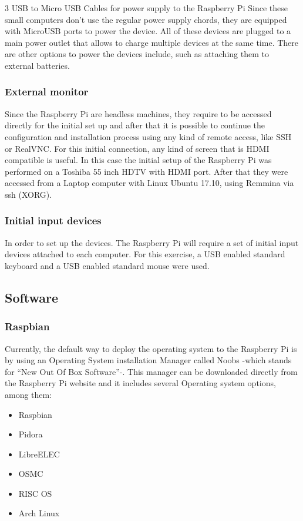 \documentclass[sigconf]{acmart}
\begin{document}
	3 USB to Micro USB Cables for power supply to the Raspberry Pi
	Since these small computers don’t use the regular power supply chords, they are equipped with MicroUSB ports to power the device.
	All of these devices are plugged to a main power outlet that allows to charge multiple devices at the same time.
	There are other options to power the devices include, such as attaching them to external batteries.
	
	\subsubsection{External monitor}
	
	Since the Raspberry Pi are headless machines, they require to be accessed directly for the initial set up and after that it is possible to continue the configuration and installation process using any kind of remote access, like SSH or RealVNC.
	For this initial connection, any kind of screen that is HDMI compatible is useful.
	In this case the initial setup of the Raspberry Pi was performed on a Toshiba 55 inch HDTV with HDMI port. After that they were accessed from a Laptop computer with Linux Ubuntu 17.10, using Remmina via ssh (XORG).
	
	\subsubsection{Initial input devices}
	
	In order to set up the devices. The Raspberry Pi will require a set of initial input devices attached to each computer.
	For this exercise, a USB enabled standard keyboard and a USB enabled standard mouse were used.
	
	\subsection{Software}
	
	\subsubsection{Raspbian}
	
	Currently, the default way to deploy the operating system to the Raspberry Pi is by using an Operating System installation Manager called Noobs -which stands for “New Out Of Box Software”-. This manager can be downloaded directly from the Raspberry Pi website and it includes several Operating system options, among them:
	

	\begin{itemize}
	\item Raspbian
	\item Pidora
	\item LibreELEC
	\item OSMC
	\item RISC OS
	\item Arch Linux
	\end{itemize}
	
\end{document}
